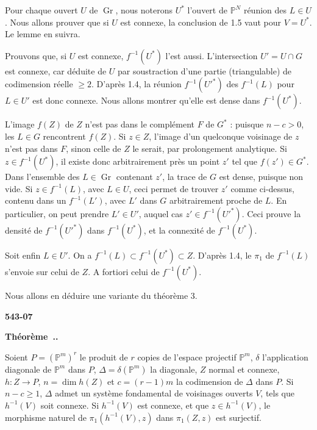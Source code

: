 \documentclass[12pt,a4paper]{article}
\newcounter{secitem}
\renewcommand{\thesecitem}{\thesection.\arabic{secitem}}
\newenvironment{sectheorem}{%
  \refstepcounter{secitem}%
  \par\medskip\noindent\textbf{Théorème~\thesecitem.}~\ignorespaces
}{\par\medskip}
\DeclareMathOperator{\Gr}{Gr}
\begin{document}
Pour chaque ouvert $U$ de $\Gr$, nous noterons $U^*$ l'ouvert de $\mathbb{P}^N$ réunion des $L \in U$. Nous allons prouver que si $U$ est connexe, la conclusion de 1.5 vaut pour $V = U^*$. Le lemme en suivra.

Prouvons que, si $U$ est connexe, $f^{-1}(U^*)$ l'est aussi. L'intersection $U' = U \cap G$ est connexe, car déduite de $U$ par soustraction d'une partie (triangulable) de codimension réelle $\geq 2$. D'après 1.4, la réunion $f^{-1}(U'^*)$ des $f^{-1}(L)$ pour $L \in U'$ est donc connexe. Nous allons montrer qu'elle est dense dans $f^{-1}(U^*)$.

L'image $f(Z)$ de $Z$ n'est pas dans le complément $F$ de $G^*$ : puisque $n - c > 0$, les $L \in G$ rencontrent $f(Z)$. Si $z \in Z$, l'image d'un quelconque voisinage de $z$ n'est pas dans $F$, sinon celle de $Z$ le serait, par prolongement analytique. Si $z \in f^{-1}(U^*)$, il existe donc arbitrairement près un point $z'$ tel que $f(z') \in G^*$. Dans l'ensemble des $L \in \Gr$ contenant $z'$, la trace de $G$ est dense, puisque non vide. Si $z \in f^{-1}(L)$, avec $L \in U$, ceci permet de trouver $z'$ comme ci-dessus, contenu dans un $f^{-1}(L')$, avec $L'$ dans $G$ arbitrairement proche de $L$. En particulier, on peut prendre $L' \in U'$, auquel cas $z' \in f^{-1}(U'^*)$. Ceci prouve la densité de $f^{-1}(U'^*)$ dans $f^{-1}(U^*)$, et la connexité de $f^{-1}(U^*)$.

Soit enfin $L \in U'$. On a $f^{-1}(L) \subset f^{-1}(U^*) \subset Z$. D'après 1.4, le $\pi_1$ de $f^{-1}(L)$ s'envoie sur celui de $Z$. A fortiori celui de $f^{-1}(U^*)$.

Nous allons en déduire une variante du théorème 3.

\newpage
\begin{flushright}
\textbf{543-07}
\end{flushright}

\begin{sectheorem}
Soient $P = (\mathbb{P}^m)^r$ le produit de $r$ copies de l'espace projectif $\mathbb{P}^m$, $\delta$ l'application diagonale de $\mathbb{P}^m$ dans $P$, $\Delta = \delta(\mathbb{P}^m)$ la diagonale, $Z$ normal et connexe, $h : Z \to P$, $n = \dim h(Z)$ et $c = (r-1)m$ la codimension de $\Delta$ dans $P$. Si $n - c \geq 1$, $\Delta$ admet un système fondamental de voisinages ouverts $V$, tels que $h^{-1}(V)$ soit connexe. Si $h^{-1}(V)$ est connexe, et que $z \in h^{-1}(V)$, le morphisme naturel de $\pi_1(h^{-1}(V), z)$ dans $\pi_1(Z, z)$ est surjectif.
\end{sectheorem}
\end{document}
